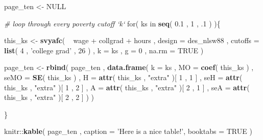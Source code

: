 \documentclass[]{book}
\newenvironment{Shaded}{\begin{snugshade}}{\end{snugshade}}
\newcommand{\KeywordTok}[1]{\textcolor[rgb]{0.13,0.29,0.53}{\textbf{{#1}}}}
\newcommand{\DataTypeTok}[1]{\textcolor[rgb]{0.13,0.29,0.53}{{#1}}}
\newcommand{\DecValTok}[1]{\textcolor[rgb]{0.00,0.00,0.81}{{#1}}}
\newcommand{\FloatTok}[1]{\textcolor[rgb]{0.00,0.00,0.81}{{#1}}}
\newcommand{\StringTok}[1]{\textcolor[rgb]{0.31,0.60,0.02}{{#1}}}
\newcommand{\CommentTok}[1]{\textcolor[rgb]{0.56,0.35,0.01}{\textit{{#1}}}}
\newcommand{\OtherTok}[1]{\textcolor[rgb]{0.56,0.35,0.01}{{#1}}}
\newcommand{\NormalTok}[1]{{#1}}
\begin{document}
\begin{Shaded}
\begin{Highlighting}[]
\NormalTok{page_ten <-}\StringTok{ }\OtherTok{NULL}

\CommentTok{# loop through every poverty cutoff `k`}
\NormalTok{for( ks in }\KeywordTok{seq}\NormalTok{( }\FloatTok{0.1} \NormalTok{, }\DecValTok{1} \NormalTok{, .}\DecValTok{1} \NormalTok{) )\{}
    
    \NormalTok{this_ks <-}
\StringTok{        }\KeywordTok{svyafc}\NormalTok{(}
            \NormalTok{~}\StringTok{ }\NormalTok{wage +}\StringTok{ }\NormalTok{collgrad +}\StringTok{ }\NormalTok{hours , }
            \DataTypeTok{design =} \NormalTok{des_nlsw88 , }
            \DataTypeTok{cutoffs =} \KeywordTok{list}\NormalTok{( }\DecValTok{4} \NormalTok{, }\StringTok{'college grad'} \NormalTok{, }\DecValTok{26} \NormalTok{) , }
            \DataTypeTok{k =} \NormalTok{ks , }
            \DataTypeTok{g =} \DecValTok{0} \NormalTok{, }
            \DataTypeTok{na.rm =} \OtherTok{TRUE} 
           \NormalTok{)}
    
    \NormalTok{page_ten <-}
\StringTok{        }\KeywordTok{rbind}\NormalTok{(}
            \NormalTok{page_ten ,}
            \KeywordTok{data.frame}\NormalTok{( }
                \DataTypeTok{k =} \NormalTok{ks , }
                \DataTypeTok{MO =} \KeywordTok{coef}\NormalTok{( this_ks ) ,}
                \DataTypeTok{seMO =} \KeywordTok{SE}\NormalTok{( this_ks ) ,}
                \DataTypeTok{H =} \KeywordTok{attr}\NormalTok{( this_ks , }\StringTok{"extra"} \NormalTok{)[ }\DecValTok{1} \NormalTok{, }\DecValTok{1} \NormalTok{] ,}
                \DataTypeTok{seH =} \KeywordTok{attr}\NormalTok{( this_ks , }\StringTok{"extra"} \NormalTok{)[ }\DecValTok{1} \NormalTok{, }\DecValTok{2} \NormalTok{] ,}
                \DataTypeTok{A =} \KeywordTok{attr}\NormalTok{( this_ks , }\StringTok{"extra"} \NormalTok{)[ }\DecValTok{2} \NormalTok{, }\DecValTok{1} \NormalTok{] ,}
                \DataTypeTok{seA =} \KeywordTok{attr}\NormalTok{( this_ks , }\StringTok{"extra"} \NormalTok{)[ }\DecValTok{2} \NormalTok{, }\DecValTok{2} \NormalTok{]}
          \NormalTok{)}
        \NormalTok{)}
    
\NormalTok{\}}

\NormalTok{knitr::}\KeywordTok{kable}\NormalTok{(}
  \NormalTok{page_ten , }\DataTypeTok{caption =} \StringTok{'Here is a nice table!'}\NormalTok{,}
  \DataTypeTok{booktabs =} \OtherTok{TRUE}
\NormalTok{)}
\end{Highlighting}
\end{Shaded}
\end{document}

